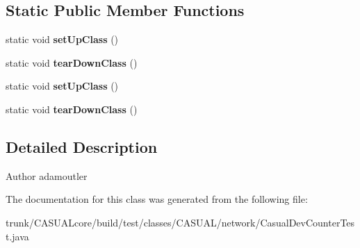 \subsection*{Static Public Member Functions}
\begin{DoxyCompactItemize}
\item 
\hypertarget{class_c_a_s_u_a_l_1_1network_1_1_casual_dev_counter_test_a2dc221e20a7a86153ac9456b922ea2b4}{static void {\bfseries set\-Up\-Class} ()}\label{class_c_a_s_u_a_l_1_1network_1_1_casual_dev_counter_test_a2dc221e20a7a86153ac9456b922ea2b4}

\item 
\hypertarget{class_c_a_s_u_a_l_1_1network_1_1_casual_dev_counter_test_a5a6b41c9de4ca8dff3bd950783bbb2ca}{static void {\bfseries tear\-Down\-Class} ()}\label{class_c_a_s_u_a_l_1_1network_1_1_casual_dev_counter_test_a5a6b41c9de4ca8dff3bd950783bbb2ca}

\item 
\hypertarget{class_c_a_s_u_a_l_1_1network_1_1_casual_dev_counter_test_a2dc221e20a7a86153ac9456b922ea2b4}{static void {\bfseries set\-Up\-Class} ()}\label{class_c_a_s_u_a_l_1_1network_1_1_casual_dev_counter_test_a2dc221e20a7a86153ac9456b922ea2b4}

\item 
\hypertarget{class_c_a_s_u_a_l_1_1network_1_1_casual_dev_counter_test_a5a6b41c9de4ca8dff3bd950783bbb2ca}{static void {\bfseries tear\-Down\-Class} ()}\label{class_c_a_s_u_a_l_1_1network_1_1_casual_dev_counter_test_a5a6b41c9de4ca8dff3bd950783bbb2ca}

\end{DoxyCompactItemize}


\subsection{Detailed Description}
\begin{DoxyAuthor}{Author}
adamoutler 
\end{DoxyAuthor}


The documentation for this class was generated from the following file\-:\begin{DoxyCompactItemize}
\item 
trunk/\-C\-A\-S\-U\-A\-Lcore/build/test/classes/\-C\-A\-S\-U\-A\-L/network/Casual\-Dev\-Counter\-Test.\-java\end{DoxyCompactItemize}
